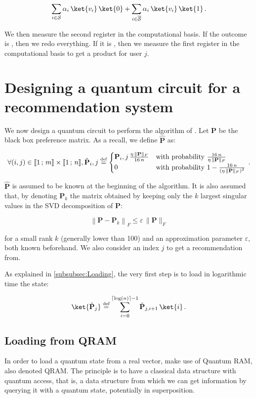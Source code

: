 \documentclass[11pt, a4paper]{article}
\begin{document}
                \[\sum_{i\in\mathcal{S}}\alpha_i\,\ket{v_i}\,\ket{0} + \sum_{i\in\overline{\mathcal{S}}}\alpha_i\,\ket{v_i}\,\ket{1}\,.\]
                
                We then measure the second register in the computational basis. If the outcome is , then we redo everything. If it is , then we measure the first register in the computational basis to get a product for user \(j\).
                
    \section{Designing a quantum circuit for a recommendation system}
        \label{sec:QCircuit}
        We now design a quantum circuit to perform the algorithm of \citeauthor{QRS}. Let \(\mathbf{P}\) be the black box preference matrix. As a recall, we define \(\hat{\mathbf{P}}\) as:
        
        \[\forall(i, j)\in\llbracket1\,;\,m\rrbracket\times\llbracket1\,;\,n\rrbracket,\hat{\mathbf{P}}_i,j\overset{\text{\tiny{def}}}{=}\begin{cases}\mathbf{P}_i,j\,\frac{\eta\,\|\mathbf{P}\|_F}{16\,n}&\text{with probability } \frac{16\,n}{\eta\,\|\mathbf{P}\|_F}\\0&\text{with probability } 1-\frac{16\,n}{\left(\eta\,\|\mathbf{P}\|_F\right)^2}\end{cases}\,.\]
        
        \(\hat{\mathbf{P}}\) is assumed to be known at the beginning of the algorithm. It is also assumed that, by denoting \(\mathbf{P}_k\) the matrix obtained by keeping only the \(k\) largest singular values in the SVD decomposition of \(\mathbf{P}\):
        
        \[\left\|\mathbf{P}-\mathbf{P}_k\right\|_F\leqslant\varepsilon\,\|\mathbf{P}\|_F\]
        
        for a small rank \(k\) (generally lower than 100) and an approximation parameter \(\varepsilon\), both known beforehand. We also consider an index \(j\) to get a recommendation from.
        
        As explained in \autoref{subsubsec:Loading}, the very first step is to load in logarithmic time the state:
        
        \[\ket{\hat{\mathbf{P}}_j} \overset{\text{\tiny{def}}}{=} \sum_{i=0}^{\lceil\log(n)\rceil-1}\hat{\mathbf{P}}_{j,i + 1}\,\ket{i}\,.\]
        
        \subsection{Loading from QRAM}
            \label{subsec:LoadingQRAM}
            In order to load a quantum state from a real vector, \citeauthor{QRS} make use of Quantum RAM, also denoted QRAM. The principle is to have a classical data structure with quantum access, that is, a data structure from which we can get information by querying it with a quantum state, potentially in superposition.
            
\end{document}
